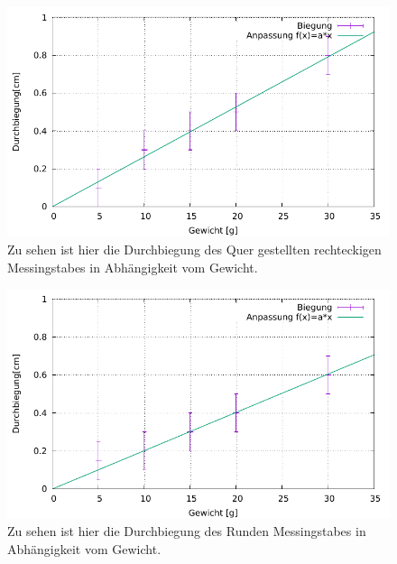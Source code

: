 \begin{figure}[h]
	\centering
	\includegraphics[width=1\textwidth]{res/DurchbiegungMessingQuer.pdf}
	\caption{Zu sehen ist hier die Durchbiegung des Quer gestellten rechteckigen Messingstabes in Abhängigkeit vom Gewicht.}
	\label{fig:durchbiegungMessQuer}
\end{figure}

\begin{figure}[h]
	\centering
	\includegraphics[width=1\textwidth]{res/DurchbiegungMessingRund.pdf}
	\caption{Zu sehen ist hier die Durchbiegung des Runden Messingstabes in Abhängigkeit vom Gewicht.}
	\label{fig:durchbiegungMessRund}
\end{figure}

